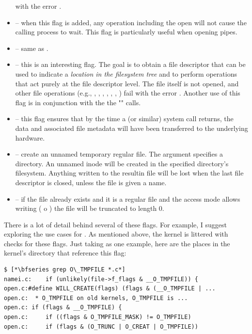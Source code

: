 \begin{itemize}
		with the error . 
	\item {} -- when this flag is added, any operation including the open will not cause the calling process
		to wait. This flag is particularly useful when opening pipes. 
	\item {} -- same as .
	\item {} -- this is an interesting flag. The goal is to obtain a file descriptor that can be used  to  indicate  a 
		\textit{location in the filesystem tree} and to perform operations that act  purely  at  the  file  descriptor level.  
		The file itself is not opened, and other file operations  (e.g.,  ,  ,  ,  , 
		, , ) fail with the error . Another use of this flag is in conjunction
		with the the "" calls.
	\item {} -- this flag ensures that by the time a  (or similar) system call returns, the data and
              associated file metadata will have been transferred to the underlying hardware.
	\item {} -- create an unnamed temporary regular file.  The  argument specifies a directory. 
		An unnamed inode will be created in the specified directory's filesystem.  Anything written to the resultin  file will be 
		lost when the last file descriptor is closed, unless the file is given a name.
	\item {} -- if  the file already exists and it is a regular file and the access mode allows writing 
		( o  )  the file will be truncated to length 0.
\end{itemize}

\noindent
There is a lot of detail behind several of these flags. For example, I suggest exploring the use cases for . As mentioned above, the kernel is littered with checks for these flags. Just taking  as one example, here are the places in the kernel's  directory that reference this flag:

\begin{lstlisting}
$ [*\bfseries grep O\_TMPFILE *.c*]
namei.c:	if (unlikely(file->f_flags & __O_TMPFILE)) {
open.c:#define WILL_CREATE(flags) (flags & (__O_TMPFILE | ...
open.c:	 * O_TMPFILE on old kernels, O_TMPFILE is ...
open.c:	if (flags & __O_TMPFILE) {
open.c:		if ((flags & O_TMPFILE_MASK) != O_TMPFILE)
open.c:		if (flags & (O_TRUNC | O_CREAT | O_TMPFILE))
\end{lstlisting}

